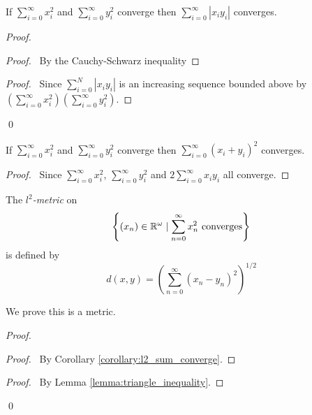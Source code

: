 \begin{lemma}
    If $\sum_{i=0}^\infty x_i^2$ and $\sum_{i=0}^\infty y_i^2$ converge then $\sum_{i=0}^\infty |x_i y_i|$ converges.
\end{lemma}

\begin{proof}
    \pf
    \begin{proof}
        \pf\ By the Cauchy-Schwarz inequality
    \end{proof}
    \qedstep
    \begin{proof}
        \pf\ Since $\sum_{i=0}^N |x_i y_i|$ is an increasing sequence bounded above by \\ $(\sum_{i=0}^\infty x_i^2) (\sum_{i=0}^\infty y_i^2)$.
    \end{proof}
    \qed
\end{proof}

\begin{corollary}
    \label{corollary:l2_sum_converge}
    If $\sum_{i=0}^\infty x_i^2$ and $\sum_{i=0}^\infty y_i^2$ converge then $\sum_{i=0}^\infty (x_i + y_i)^2$ converges.
\end{corollary}

\begin{proof}
    \pf\ Since $\sum_{i=0}^\infty x_i^ 2$, $\sum_{i=0}^\infty y_i^2$ and $2 \sum_{i=0}^\infty x_i y_i$ all converge.
\end{proof}

\begin{definition}[$l^2$-metric]
    The \emph{$l^2$-metric} on 
    \[ \left\{ (x_n) \in \mathbb{R}^\omega \mid \sum_{n=0}^\infty x_n^2 \text{ converges} \right\} \] is defined by
    \[ d(x,y) = \left( \sum_{n=0}^\infty (x_n - y_n)^2 \right)^{1/2} \]
\end{definition}

We prove this is a metric.

\begin{proof}
    \pf
    \begin{proof}
        \pf\ By Corollary \ref{corollary:l2_sum_converge}.
    \end{proof}
    \begin{proof}
        \pf\ By Lemma \ref{lemma:triangle_inequality}.
    \end{proof}
    \qed
\end{proof}

